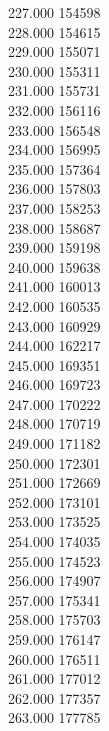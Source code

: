 { 227.000	154598 \\
 228.000	154615 \\
 229.000	155071 \\
 230.000	155311 \\
 231.000	155731 \\
 232.000	156116 \\
 233.000	156548 \\
 234.000	156995 \\
 235.000	157364 \\
 236.000	157803 \\
 237.000	158253 \\
 238.000	158687 \\
 239.000	159198 \\
 240.000	159638 \\
 241.000	160013 \\
 242.000	160535 \\
 243.000	160929 \\
 244.000	162217 \\
 245.000	169351 \\
 246.000	169723 \\
 247.000	170222 \\
 248.000	170719 \\
 249.000	171182 \\
 250.000	172301 \\
 251.000	172669 \\
 252.000	173101 \\
 253.000	173525 \\
 254.000	174035 \\
 255.000	174523 \\
 256.000	174907 \\
 257.000	175341 \\
 258.000	175703 \\
 259.000	176147 \\
 260.000	176511 \\
 261.000	177012 \\
 262.000	177357 \\
 263.000	177785 \\
}
